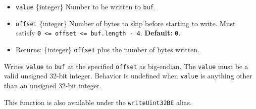 \begin{itemize}
\tightlist
\item
  \texttt{value} \{integer\} Number to be written to \texttt{buf}.
\item
  \texttt{offset} \{integer\} Number of bytes to skip before starting to
  write. Must satisfy
  \texttt{0\ \textless{}=\ offset\ \textless{}=\ buf.length\ -\ 4}.
  \textbf{Default:} \texttt{0}.
\item
  Returns: \{integer\} \texttt{offset} plus the number of bytes written.
\end{itemize}

Writes \texttt{value} to \texttt{buf} at the specified \texttt{offset}
as big-endian. The \texttt{value} must be a valid unsigned 32-bit
integer. Behavior is undefined when \texttt{value} is anything other
than an unsigned 32-bit integer.

This function is also available under the \texttt{writeUint32BE} alias.

\begin{Shaded}
\begin{Highlighting}[]
\NormalTok{ \{ }\NormalTok{ \} } \OperatorTok{;}

\OperatorTok{=} \NormalTok{(}\NormalTok{)}\OperatorTok{;}

\NormalTok{(}\OperatorTok{,} \NormalTok{)}\OperatorTok{;}

\OperatorTok{;}
\end{Highlighting}
\end{Shaded}

\begin{Shaded}
\begin{Highlighting}[]
\NormalTok{ \{ }\NormalTok{ \} }\OperatorTok{=} \NormalTok{(}\NormalTok{)}\OperatorTok{;}

\OperatorTok{=} \NormalTok{(}\NormalTok{)}\OperatorTok{;}

\NormalTok{(}\OperatorTok{,} \NormalTok{)}\OperatorTok{;}

\OperatorTok{;}
\end{Highlighting}
\end{Shaded}

